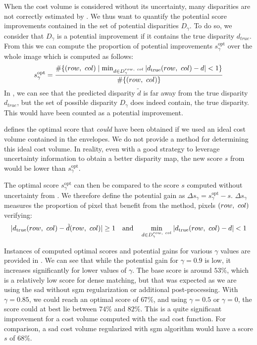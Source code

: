 When the cost volume is considered without its uncertainty, many disparities are not correctly estimated by . We thus want to quantify the potential score improvements contained in the set of potential disparities $D_\gamma$. To do so, we consider that $D_\gamma$ is a potential improvement if it contains the true disparity $d_{true}$. From this we can compute the proportion of potential improvements $s_\gamma^{\text{opt}}$ over the whole image which is computed as follows:
\begin{equation}\label{eq:optimal_score}
    s_\gamma^{\text{opt}} = \frac{\#\{(row, ~col) \mid \min_{d \in D_\gamma^{row, ~col}} |d_{\mathrm{true}}(row, ~col) - d| < 1\}}{\#\{(row, ~col)\}}
\end{equation}
In , we can see that the predicted disparity $\tilde{d}$ is far away from the true disparity $d_{true}$, but the set of possible disparity $D_\gamma$ does indeed contain, the true disparity. This would have been counted as a potential improvement.

\begin{remark}
     defines the optimal score that \textit{could} have been obtained if we used an ideal cost volume contained in the envelopes. We do not provide a method for determining this ideal cost volume. In reality, even with a good strategy to leverage uncertainty information to obtain a better disparity map, the new score $s$ from  would be lower than $s_\gamma^{\text{opt}}$.
\end{remark}

The optimal score \( s_\gamma^{\text{opt}} \) can then be compared to the score $s$ computed without uncertainty from . We therefore define the potential gain as \( \Delta s_\gamma = s_\gamma^{\text{opt}} - s \). $\Delta s_\gamma$ measures the proportion of pixel that benefit from the method, \ie pixels $(row, ~col)$ verifying:
\begin{equation}
    |d_{\mathrm{true}}(row, ~col) - \tilde{d}(row, ~col)| \geq 1 \quad \text{and} \quad \min_{d \in D_\gamma^{row, ~col}} |d_{\mathrm{true}}(row, ~col) - d| < 1
\end{equation}

Instances of computed optimal scores and potential gains for various $\gamma$ values are provided in . We can see that while the potential gain for $\gamma = 0.9$ is low, it increases significantly for lower values of $\gamma$. The base score is around $53\%$, which is a relatively low score for dense matching, but that was expected as we are using the \acrshort{sad} without \acrshort{sgm} regularization or additional post-processing. With $\gamma=0.85$, we could reach an optimal score of $67\%$, and using $\gamma=0.5$ or $\gamma=0$, the score could at best lie between $74\%$ and $82\%$. This is a quite significant improvement for a cost volume computed with the \acrshort{sad} cost function. For comparison, a \acrshort{sad} cost volume regularized with \acrshort{sgm} algorithm would have a score $s$ of $68\%$.


